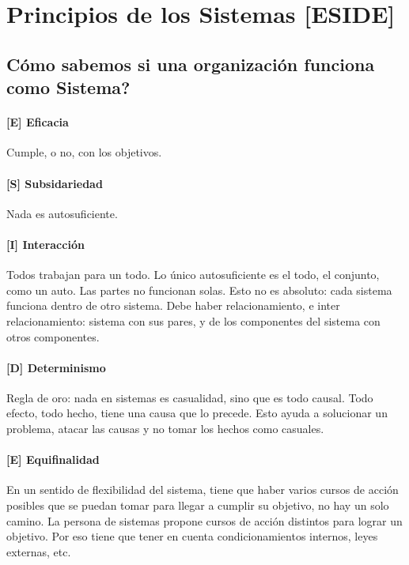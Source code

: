 \hypertarget{cuxf3mo-sabemos-si-una-organizaciuxf3n-funciona-como-sistema-principios-eside}{%
\section{Principios de los Sistemas
{[}ESIDE{]}}\label{cuxf3mo-sabemos-si-una-organizaciuxf3n-funciona-como-sistema-principios-eside}}

\subsection*{Cómo sabemos si una organización funciona como Sistema?
}

\hypertarget{eficacia}{%
\paragraph{%
{[}E{]}
Eficacia}\label{eficacia}}
Cumple, o no, con los objetivos.

\hypertarget{subsidariedad}{%
\paragraph{%
{[}S{]}
Subsidariedad}\label{subsidariedad}}
Nada es autosuficiente.

\hypertarget{interaccion}{%
\paragraph{%
{[}I{]}
Interacción}\label{interaccion}}
Todos trabajan para un todo. Lo único autosuficiente es el todo, el conjunto, como un auto. Las partes no funcionan solas. Esto no es absoluto: cada sistema funciona dentro de otro sistema. Debe haber relacionamiento, e inter relacionamiento: sistema con sus pares, y de los componentes del sistema con otros componentes.

\hypertarget{determinismo}{%
\paragraph{%
{[}D{]}
Determinismo}\label{determinismo}}
Regla de oro: nada en sistemas es casualidad, sino que es todo causal. Todo efecto, todo hecho, tiene una causa que lo precede. Esto ayuda a solucionar un problema, atacar las causas y no tomar los hechos como casuales.

\hypertarget{equifinalidad}{%
\paragraph{%
{[}E{]}
Equifinalidad}\label{equifinalidad}}
En un sentido de flexibilidad del sistema, tiene que haber varios cursos de acción posibles que se puedan tomar para llegar a cumplir su objetivo, no hay un solo camino. La persona de sistemas propone cursos de acción distintos para lograr un objetivo. Por eso tiene que tener en cuenta condicionamientos internos, leyes externas, etc.

